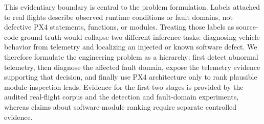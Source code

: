 This evidentiary boundary is central to the problem formulation. Labels attached to real flights describe observed runtime conditions or fault domains, not defective PX4 statements, functions, or modules. Treating those labels as source-code ground truth would collapse two different inference tasks: diagnosing vehicle behavior from telemetry and localizing an injected or known software defect. We therefore formulate the engineering problem as a hierarchy: first detect abnormal telemetry, then diagnose the affected fault domain, expose the telemetry evidence supporting that decision, and finally use PX4 architecture only to rank plausible module inspection leads. Evidence for the first two stages is provided by the audited real-flight corpus and the detection and fault-domain experiments, whereas claims about software-module ranking require separate controlled evidence.
